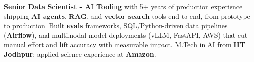\documentclass[letter,10pt]{article}
\begin{document}

\textbf{Senior Data Scientist - AI Tooling} with 5+ years of production experience shipping \textbf{AI agents}, \textbf{RAG}, and \textbf{vector search} tools end-to-end, from prototype to production.
Built \textbf{evals} frameworks, SQL/Python-driven data pipelines (\textbf{Airflow}), and multimodal model deployments (vLLM, FastAPI, AWS) that cut manual effort and lift accuracy with measurable impact.
M.Tech in AI from \textbf{IIT Jodhpur}; applied-science experience at \textbf{Amazon}.
\end{document}
